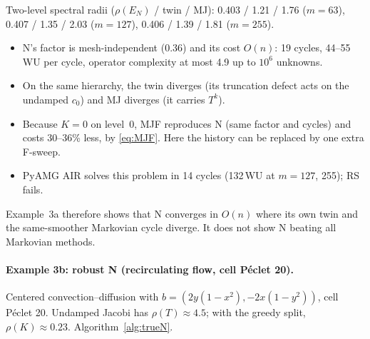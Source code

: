 Two-level spectral radii ($\rho(E_N)$ / twin / MJ): 0.403 / 1.21 / 1.76 ($m=63$), 0.407 / 1.35 / 2.03 ($m=127$),
0.406 / 1.39 / 1.81 ($m=255$).
\begin{itemize}
  \item N's factor is mesh-independent (0.36) and its cost $O(n)$: 19 cycles, 44--55\,WU per cycle, operator
    complexity at most 4.9 up to $10^6$ unknowns.
  \item On the same hierarchy, the twin diverges (its truncation defect acts on the undamped $c_0$) and MJ diverges
    (it carries $T^k$).
  \item Because $K=0$ on level~0, MJF reproduces N (same factor and cycles) and costs 30--36\% less, by
    \eqref{eq:MJF}. Here the history can be replaced by one extra F-sweep.
  \item PyAMG AIR solves this problem in 14 cycles (132\,WU at $m=127$, 255); RS fails.
\end{itemize}
Example~3a therefore shows that N converges in $O(n)$ where its own twin and the same-smoother Markovian cycle
diverge. It does not show N beating all Markovian methods.

\paragraph{Example 3b: robust N (recirculating flow, cell P\'eclet 20).}
Centered convection--diffusion with $b=(2y(1-x^2),-2x(1-y^2))$, cell P\'eclet 20. Undamped Jacobi has
$\rho(T)\approx4.5$; with the greedy split, $\rho(K)\approx0.23$. Algorithm~\ref{alg:trueN}.

\begin{table}[t]
\centering
\caption{Example 3b. Robust N and Markovian cycles on the same hierarchy. The $m=1023$ row comes from the development
code (same configuration); its work was not recorded.}\label{tab:trueN-b}
\end{table}

